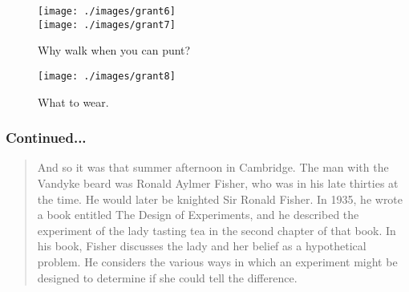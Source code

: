 \documentclass{beamer}
\begin{document}
\begin{frame}

\begin{figure}
 \texttt{[image: ./images/grant6]}\\
\vspace{0.6em}
 \texttt{[image: ./images/grant7]}

\caption{Why walk when you can punt?}
 \end{figure}

\end{frame}

 \begin{frame}

\begin{figure}
 \texttt{[image: ./images/grant8]}

\caption{What to wear.}
 \end{figure}

\end{frame}

\begin{frame}
\frametitle{Continued...}
\footnotesize
\begin{quote}
And so it was that summer afternoon in Cambridge. The man with the Vandyke beard was Ronald Aylmer Fisher, who was in his late thirties at the time. He would later be knighted Sir Ronald Fisher. In 1935, he wrote a book entitled The Design of Experiments, and he described the experiment of the lady tasting tea in the second chapter of that book. In his book, Fisher discusses the lady and her belief as a hypothetical problem. He considers the various ways in which an experiment might be designed to determine if she could tell the difference.
\end{quote}
\end{frame}
\end{document}
